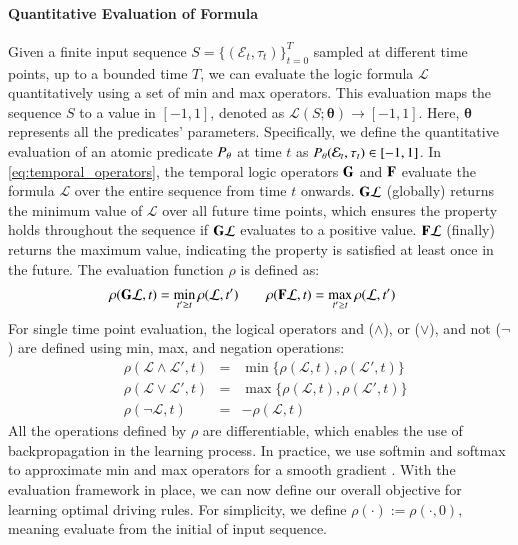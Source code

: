 \paragraph{Quantitative Evaluation of Formula}
Given a finite input sequence $S = \{(\mathcal{E}_t, \tau_t)\}_{t=0}^T$ sampled at different time points, up to a bounded time $T$, we can evaluate the logic formula $\mathcal{L}$ quantitatively using a set of min and max operators\cite{fainekos2009robustness, deshmukh2017robust}. This evaluation maps the sequence $S$ to a value in $[-1, 1]$, denoted as
$
    \mathcal{L}(S; \boldsymbol{\theta}) \rightarrow [-1, 1].
$
Here, $\boldsymbol{\theta}$ represents all the predicates' parameters.
Specifically, we define the quantitative evaluation of an atomic predicate $P_{\theta}$ at time $t$ as $P_{\theta}(\mathcal{E}_t, \tau_t) \in [-1, 1]$. In \eqref{eq:temporal_operators}, the temporal logic operators $\mathbf{G}$ and $\mathbf{F}$ evaluate the formula $\mathcal{L}$ over the entire sequence from time $t$ onwards. $\mathbf{G} \mathcal{L}$ (globally) returns the minimum value of $\mathcal{L}$ over all future time points, which ensures the property holds throughout the sequence if $\mathbf{G} \mathcal{L}$ evaluates to a positive value. $\mathbf{F} \mathcal{L}$ (finally) returns the maximum value, indicating the property is satisfied at least once in the future. The evaluation function $\rho$ is defined as:
\begin{equation}
    \begin{aligned}
        \rho(\mathbf{G} \mathcal{L}, t) & = \min_{t' \geq t} \rho(\mathcal{L}, t') \quad & \rho(\mathbf{F} \mathcal{L}, t) & = \max_{t' \geq t} \rho(\mathcal{L}, t')
    \end{aligned}
\end{equation}
\label{eq:temporal_operators}
For single time point evaluation, the logical operators and ($\land$), or ($\lor$), and not ($\lnot$) are defined using min, max, and negation operations:
\begin{equation}
    \begin{aligned}
         & \rho(\mathcal{L} \land \mathcal{L}', t) & = & \min\{\rho(\mathcal{L}, t), \rho(\mathcal{L}', t)\} \\
         & \rho(\mathcal{L} \lor \mathcal{L}', t)  & = & \max\{\rho(\mathcal{L}, t), \rho(\mathcal{L}', t)\} \\
         & \rho(\lnot \mathcal{L}, t)              & = & -\rho(\mathcal{L}, t)
    \end{aligned}
\end{equation}
\label{eq:fol_operators}
All the operations defined by $\rho$ are differentiable, which enables the use of backpropagation in the learning process.  In practice, we use softmin and softmax to approximate min and max operators for a smooth gradient \cite{Leung2020BackpropagationTS}. With the evaluation framework in place, we can now define our overall objective for learning optimal driving rules. For simplicity, we define $\rho(\cdot):= \rho(\cdot, 0)$, meaning evaluate from the initial of input sequence.

